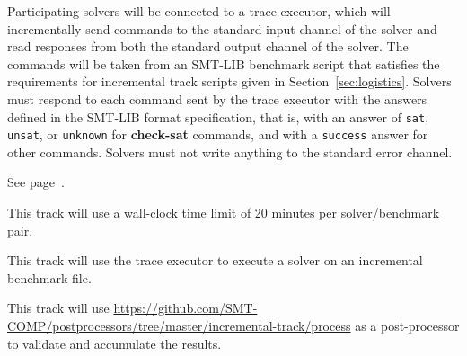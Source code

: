 \documentclass[12pt]{article}
\newcommand{\akey}[1]{\textbf{#1}\xspace}
\newcommand{\rem}[1]{\textcolor{red}{[#1]}}
\newcommand{\todo}[1]{\rem{TODO #1}}
\newcommand{\maintrack}{Single Query Track\xspace}
\newcommand{\inctrack}{Incremental Track\xspace}
\newcommand{\challtrack}{Industry-Challenge Track\xspace}
\begin{document}
Participating solvers will be connected to a trace executor, which
will incrementally send commands to the standard input channel of the
solver and read responses from both the standard output channel of the
solver.  The commands will be taken from an SMT-LIB benchmark script
that satisfies the requirements for incremental track scripts given in
Section~\ref{sec:logistics}.
%
Solvers must respond to each command sent by the trace executor with
the answers defined in the SMT-LIB format specification, that is, with
an answer of \texttt{sat}, \texttt{unsat}, or \texttt{unknown} for
\akey{check-sat} commands, and with a \texttt{success} answer for
other commands.
Solvers must not write anything to the standard error channel.

 See page~\pageref{benchmark-selection}.

This track will use a wall-clock time limit of 20 minutes per solver/benchmark
pair.

 This track will use the trace executor
to execute a solver on an incremental benchmark file.

This track will use
{\url{https://github.com/SMT-COMP/postprocessors/tree/master/incremental-track/process}}
as a post-processor
to validate and accumulate the results.




\end{document}
